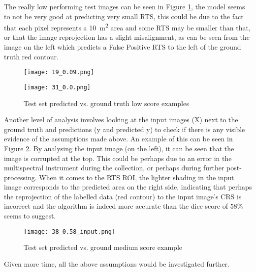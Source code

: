  The really low performing test images can be seen in Figure \ref{low_score_pic}, the model seems to not be very good at predicting very small \gls{RTS}, this could be due to the fact that each pixel represents a \SI{10}{\metre\squared} area and some \gls{RTS} may be smaller than that, or that the image reprojection has a slight misalignment, as can be seen from the image on the left which predicts a False Positive \gls{RTS} to the left of the ground truth red contour.

    \begin{figure}[hbt!]
        \begin{minipage}[c]{0.55\linewidth}
        \texttt{[image: 19\_0.09.png]}
        \label{best_dice}
        \end{minipage}
            \hfill
            \begin{minipage}[c]{0.55\linewidth}
            \texttt{[image: 31\_0.0.png]}
            \label{low_score_pic}
        \end{minipage}
        \caption{Test set predicted vs. ground truth low score examples}
    \end{figure}

Another level of analysis involves looking at the input images (X) next to the ground truth and predictions (y and predicted y) to check if there is any visible evidence of the assumptions made above. An example of this can be seen in Figure \ref{medium_score_input_pic}. By analysing the input image (on the left), it can be seen that the image is corrupted at the top. This could be perhaps due to an error in the multispectral instrument during the collection, or perhaps during further post-processing. When it comes to the \gls{RTS} \gls{ROI}, the lighter shading in the input image corresponds to the predicted area on the right side, indicating that perhaps the reprojection of the labelled data (red contour) to the input image's \gls{CRS} is incorrect and the algorithm is indeed more accurate than the dice score of $58\%$ seems to suggest.
    \begin{figure}[hbt!]
        \centering
        \texttt{[image: 38\_0.58\_input.png]}
        \caption{Test set predicted vs. ground medium score example}
        \label{medium_score_input_pic}
    \end{figure}

Given more time, all the above assumptions would be investigated further.